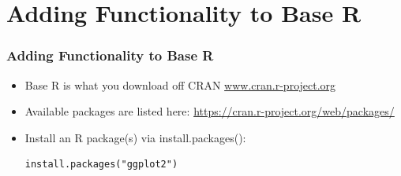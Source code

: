 \section{Adding Functionality to Base R}

\begin{frame}[fragile]
	\frametitle{Adding Functionality to Base R}

	\begin{itemize}
		\item Base R is what you download off CRAN \url{www.cran.r-project.org} 
		\item Available packages are listed here: \url{https://cran.r-project.org/web/packages/}
		\item Install an R package(s) via \ttfamily install.packages(): \normalfont 
   	\begin{lstlisting}
install.packages("ggplot2")
	\end{lstlisting}
	\end{itemize} 	
\end{frame}




